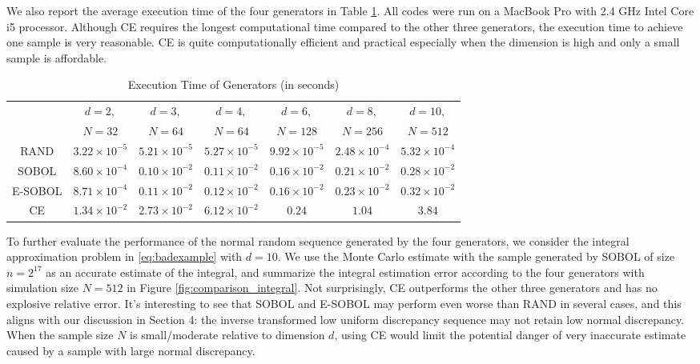 \documentclass[graybox]{svmult}
\begin{document}
We also report the average execution time of the four generators in Table \ref{tab:ExeTime}. All codes were run on a MacBook Pro with 2.4 GHz Intel Core i5 processor. Although CE requires the longest computational time compared to the other three generators, the execution time to achieve one sample is very reasonable. CE is quite computationally efficient and practical especially when the dimension is high and only a small sample is affordable.

\begin{table}[htbp]
  \centering
  \caption{Execution Time of Generators (in seconds)}
    \begin{tabular}{ccccccc}
    \hline
          & $d=2,$   & $d=3,$   & $d=4,$   & $d=6,$   & $d=8,$   & $d=10,$ \\
  & $N=32$   & $N=64$   & $N=64$   & $N=128$   & $N=256$   & $N =512$ \\
    \hline
    RAND  & $3.22\times 10^{-5}$      &  $5.21\times 10^{-5}$     & $5.27\times 10^{-5}$      &  $9.92\times 10^{-5}$     & $2.48\times 10^{-4}$      & $ 5.32\times 10^{-4}$ \\
    SOBOL & $8.60\times 10^{-4}$      &  $0.10\times 10^{-2}$     &    $0.11\times 10^{-2}$   &  $0.16\times 10^{-2}$     & $0.21\times 10^{-2}$      &  $0.28\times 10^{-2}$\\
    E-SOBOL & $8.71\times 10^{-4}$  & $0.11\times 10^{-2}$      &     $0.12\times 10^{-2}$  &  $0.16\times 10^{-2}$     &   $0.23\times 10^{-2}$    & $0.32\times 10^{-2}$  \\
    CE    & $1.34\times 10^{-2}$      & $2.73\times 10^{-2}$      & $6.12\times 10^{-2}$      &   $0.24$    &   $1.04$    & $3.84$  \\
    \hline
    \end{tabular}%
  \label{tab:ExeTime}%
\end{table}%

To further evaluate the performance of the normal random sequence generated by the four generators, we consider the integral approximation problem in \eqref{eq:badexample} with $d=10$. We use the Monte Carlo estimate with the sample generated by SOBOL of size $n = 2^{17}$ as an accurate estimate of the integral, and summarize the integral estimation error according to the four generators with simulation size $N=512$ in Figure \ref{fig:comparison_integral}. Not surprisingly, CE outperforms the other three generators and has no explosive relative error. It's interesting to see that SOBOL and E-SOBOL may perform even worse than RAND in several cases, and this aligns with our discussion in Section 4: the inverse transformed low uniform discrepancy sequence may not retain low normal discrepancy. When the sample size $N$ is small/moderate relative to dimension $d$, using CE would limit the potential danger of very inaccurate estimate caused by a sample with large normal discrepancy.
\end{document}
